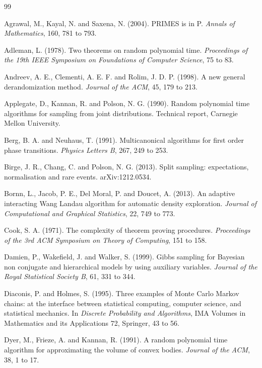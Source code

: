\documentclass[11pt,twoside,openany]{book}
\theoremstyle{plain}
\theoremstyle{definition}
\theoremstyle{remark}
\begin{document}
\begin{thebibliography}{99}

 Agrawal, M., Kayal, N. and Saxena, N. (2004). PRIMES is in P. \emph{Annals of Mathematics}, 160, 781 to 793.

 Adleman, L. (1978). Two theorems on random polynomial time. \emph{Proceedings of the 19th IEEE Symposium on Foundations of Computer Science}, 75 to 83.

 Andreev, A. E., Clementi, A. E. F. and Rolim, J. D. P. (1998). A new general derandomization method. \emph{Journal of the ACM}, 45, 179 to 213.

 Applegate, D., Kannan, R. and Polson, N. G. (1990). Random polynomial time algorithms for sampling from joint distributions. Technical report, Carnegie Mellon University.

 Berg, B. A. and Neuhaus, T. (1991). Multicanonical algorithms for first order phase transitions. \emph{Physics Letters B}, 267, 249 to 253.

 Birge, J. R., Chang, C. and Polson, N. G. (2013). Split sampling: expectations, normalisation and rare events. arXiv:1212.0534.

 Bornn, L., Jacob, P. E., Del Moral, P. and Doucet, A. (2013). An adaptive interacting Wang Landau algorithm for automatic density exploration. \emph{Journal of Computational and Graphical Statistics}, 22, 749 to 773.

 Cook, S. A. (1971). The complexity of theorem proving procedures. \emph{Proceedings of the 3rd ACM Symposium on Theory of Computing}, 151 to 158.

 Damien, P., Wakefield, J. and Walker, S. (1999). Gibbs sampling for Bayesian non conjugate and hierarchical models by using auxiliary variables. \emph{Journal of the Royal Statistical Society B}, 61, 331 to 344.

 Diaconis, P. and Holmes, S. (1995). Three examples of Monte Carlo Markov chains: at the interface between statistical computing, computer science, and statistical mechanics. In \emph{Discrete Probability and Algorithms}, IMA Volumes in Mathematics and its Applications 72, Springer, 43 to 56.

 Dyer, M., Frieze, A. and Kannan, R. (1991). A random polynomial time algorithm for approximating the volume of convex bodies. \emph{Journal of the ACM}, 38, 1 to 17.


\end{thebibliography}
\end{document}
